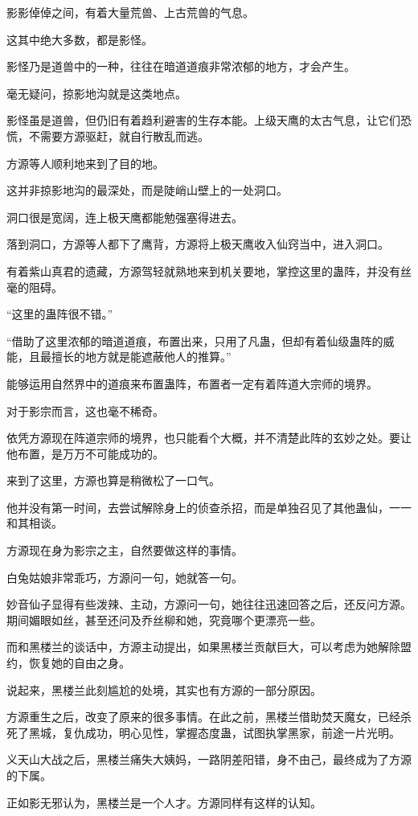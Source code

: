 \begin{this_body}
影影倬倬之间，有着大量荒兽、上古荒兽的气息。

这其中绝大多数，都是影怪。

影怪乃是道兽中的一种，往往在暗道道痕非常浓郁的地方，才会产生。

毫无疑问，掠影地沟就是这类地点。

影怪虽是道兽，但仍旧有着趋利避害的生存本能。上级天鹰的太古气息，让它们恐慌，不需要方源驱赶，就自行散乱而逃。

方源等人顺利地来到了目的地。

这并非掠影地沟的最深处，而是陡峭山壁上的一处洞口。

洞口很是宽阔，连上极天鹰都能勉强塞得进去。

落到洞口，方源等人都下了鹰背，方源将上极天鹰收入仙窍当中，进入洞口。

有着紫山真君的遗藏，方源驾轻就熟地来到机关要地，掌控这里的蛊阵，并没有丝毫的阻碍。

“这里的蛊阵很不错。”

“借助了这里浓郁的暗道道痕，布置出来，只用了凡蛊，但却有着仙级蛊阵的威能，且最擅长的地方就是能遮蔽他人的推算。”

能够运用自然界中的道痕来布置蛊阵，布置者一定有着阵道大宗师的境界。

对于影宗而言，这也毫不稀奇。

依凭方源现在阵道宗师的境界，也只能看个大概，并不清楚此阵的玄妙之处。要让他布置，是万万不可能成功的。

来到了这里，方源也算是稍微松了一口气。

他并没有第一时间，去尝试解除身上的侦查杀招，而是单独召见了其他蛊仙，一一和其相谈。

方源现在身为影宗之主，自然要做这样的事情。

白兔姑娘非常乖巧，方源问一句，她就答一句。

妙音仙子显得有些泼辣、主动，方源问一句，她往往迅速回答之后，还反问方源。期间媚眼如丝，甚至还问及乔丝柳和她，究竟哪个更漂亮一些。

而和黑楼兰的谈话中，方源主动提出，如果黑楼兰贡献巨大，可以考虑为她解除盟约，恢复她的自由之身。

说起来，黑楼兰此刻尴尬的处境，其实也有方源的一部分原因。

方源重生之后，改变了原来的很多事情。在此之前，黑楼兰借助焚天魔女，已经杀死了黑城，复仇成功，明心见性，掌握态度蛊，试图执掌黑家，前途一片光明。

义天山大战之后，黑楼兰痛失大姨妈，一路阴差阳错，身不由己，最终成为了方源的下属。

正如影无邪认为，黑楼兰是一个人才。方源同样有这样的认知。


\end{this_body}
